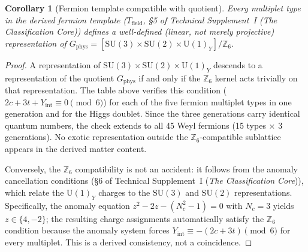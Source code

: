 \documentclass[11pt]{article}
\newtheorem{corollary}[theorem]{Corollary}
\theoremstyle{definition}
\newcommand{\SU}{\mathrm{SU}}
\newcommand{\U}{\mathrm{U}}
\newcommand{\TSI}{Technical Supplement~I (\emph{The Classification Core})}
\begin{document}
\begin{corollary}[Fermion template compatible with quotient]%
\label{cor:fermion_Z6_compat}
Every multiplet type in the derived fermion template
($T_{\mathrm{field}}$, \S5 of \TSI{}) defines a
well-defined (linear, not merely projective) representation of
$G_{\mathrm{phys}} = [\SU(3) \times \SU(2) \times \U(1)_Y] /
\mathbb{Z}_6$.
\end{corollary}

\begin{proof}
A representation of $\SU(3) \times \SU(2) \times \U(1)_Y$ descends
to a representation of the quotient
$G_{\mathrm{phys}}$ if and only if the $\mathbb{Z}_6$ kernel acts
trivially on that representation.  The table above verifies this
condition ($2c + 3t + Y_{\mathrm{int}} \equiv 0 \pmod{6}$) for each
of the five fermion multiplet types in one generation and for the
Higgs doublet.  Since the three generations carry identical quantum
numbers, the check extends to all 45 Weyl fermions (15 types
$\times$ 3 generations).  No exotic representation outside the
$\mathbb{Z}_6$-compatible sublattice appears in the derived matter
content.

Conversely, the $\mathbb{Z}_6$ compatibility is not an accident:
it follows from the anomaly cancellation conditions
(\S6 of \TSI{}), which relate the $\U(1)_Y$ charges to
the $\SU(3)$ and $\SU(2)$ representations.  Specifically, the
anomaly equation
$z^2 - 2z - (N_c^2 - 1) = 0$ with $N_c = 3$ yields
$z \in \{4, -2\}$; the resulting charge assignments automatically
satisfy the $\mathbb{Z}_6$ condition because the anomaly system
forces $Y_{\mathrm{int}} \equiv -(2c + 3t) \pmod{6}$ for every
multiplet.  This is a derived consistency, not a coincidence.
\end{proof}
\end{document}
